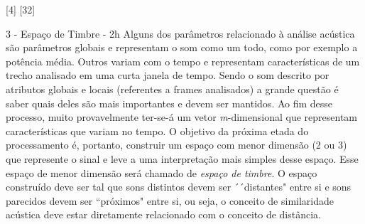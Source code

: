 [4] [32] 

3 - Espaço de Timbre - 2h
Alguns dos parâmetros relacionado à análise acústica são parâmetros globais e
representam o som como um todo, como por exemplo a potência média. Outros
variam com o tempo e representam características de um trecho analisado em uma
curta janela de tempo. Sendo o som descrito por atributos globais e locais
(referentes a frames analisados) a grande questão é saber quais deles são mais
importantes e devem ser mantidos. Ao fim desse processo, muito provavelmente
ter-se-á um vetor \textit{m}-dimensional que representam características que variam no
tempo. O objetivo da próxima etada do processamento é, portanto, construir um
espaço com menor dimensão (2 ou 3) que represente o sinal e leve a uma
interpretação mais simples desse espaço. Esse espaço de menor dimensão será
chamado de \textit{espaço de timbre}. O espaço construído deve ser tal que
sons distintos devem ser ´´distantes" entre si e sons parecidos devem ser
``próximos" entre si, ou seja, o conceito de similaridade acústica deve estar
diretamente relacionado com o conceito de distância.

 
